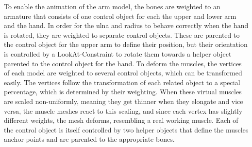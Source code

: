 To enable the animation of the arm model, the bones are weighted to an armature that consists of one control object for each the upper and lower arm and the hand. In order for the ulna and radius to behave correctly when the hand is rotated, they are weighted to separate control objects. These are parented to the control object for the upper arm to define their position, but their orientation is controlled by a LookAt-Constraint to rotate them towards a helper object parented to the control object for the hand.
To deform the muscles, the vertices of each model are weighted to several control objects, which can be transformed easily. The vertices follow the transformation of each related object to a special percentage, which is determined by their weighting. When these virtual muscles are scaled non-uniformly, meaning they get thinner when they elongate and vice versa, the muscle meshes react to this scaling, and since each vertex has slightly different weights, the mesh deforms, resembling a real working muscle. Each of the control object is itself controlled by two helper objects that define the muscles anchor points and are parented to the appropriate bones.
